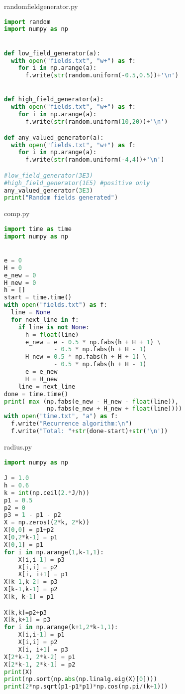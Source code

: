 \newpage
randomfieldgenerator.py
\begin{lstlisting}[language=Python]
import random
import numpy as np


def low_field_generator(a):
  with open("fields.txt", "w+") as f:
    for i in np.arange(a):
      f.write(str(random.uniform(-0.5,0.5))+'\n')


def high_field_generator(a):
  with open("fields.txt", "w+") as f:
    for i in np.arange(a):
      f.write(str(random.uniform(10,20))+'\n')

def any_valued_generator(a):
  with open("fields.txt", "w+") as f:
    for i in np.arange(a):
      f.write(str(random.uniform(-4,4))+'\n')

#low_field_generator(3E3)
#high_field_generator(1E5) #positive only
any_valued_generator(3E3)
print("Random fields generated")
\end{lstlisting}
\newpage
comp.py
\begin{lstlisting}[language=Python]
import time as time
import numpy as np


e = 0
H = 0
e_new = 0
H_new = 0
h = []
start = time.time()
with open("fields.txt") as f:
  line = None
  for next_line in f:
    if line is not None:
      h = float(line)
      e_new = e - 0.5 * np.fabs(h + H + 1) \
              - 0.5 * np.fabs(h + H - 1)
      H_new = 0.5 * np.fabs(h + H + 1) \
              - 0.5 * np.fabs(h + H - 1)
      e = e_new
      H = H_new
    line = next_line
done = time.time()
print( max (np.fabs(e_new - H_new - float(line)),
            np.fabs(e_new + H_new + float(line))))
with open("time.txt", "a") as f:
  f.write("Recurrence algorithm:\n")
  f.write("Total: "+str(done-start)+str('\n'))
  \end{lstlisting}
\newpage
radius.py
\begin{lstlisting}[language=Python]
import numpy as np

J = 1.0
h = 0.6
k = int(np.ceil(2.*J/h))
p1 = 0.5
p2 = 0
p3 = 1 - p1 - p2
X = np.zeros((2*k, 2*k))
X[0,0] = p1+p2
X[0,2*k-1] = p1
X[0,1] = p1
for i in np.arange(1,k-1,1):
    X[i,i-1] = p3
    X[i,i] = p2
    X[i, i+1] = p1
X[k-1,k-2] = p3
X[k-1,k-1] = p2
X[k, k-1] = p1

X[k,k]=p2+p3
X[k,k+1] = p3
for i in np.arange(k+1,2*k-1,1):
    X[i,i-1] = p1
    X[i,i] = p2
    X[i, i+1] = p3
X[2*k-1, 2*k-2] = p1
X[2*k-1, 2*k-1] = p2
print(X)
print(np.sort(np.abs(np.linalg.eig(X)[0])))
print(2*np.sqrt(p1-p1*p1)*np.cos(np.pi/(k+1)))
\end{lstlisting}